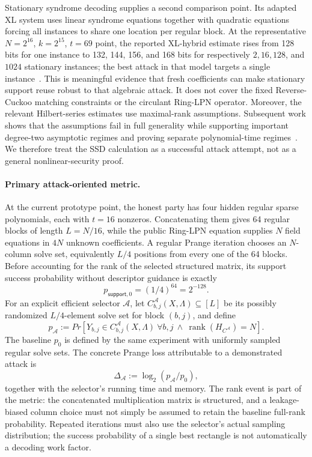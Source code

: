 Stationary syndrome decoding supplies a second comparison point.  Its adapted
XL system uses linear syndrome equations together with quadratic equations
forcing all instances to share one location per regular block.  At the
representative $N=2^{16}$, $k=2^{15}$, $t=69$ point, the reported XL-hybrid
estimate rises from 128 bits for one instance to 132, 144, 156, and 168 bits
for respectively $2,16,128$, and $1024$ stationary instances; the best attack
in that model targets a single instance~\cite{Stationary}.  This is meaningful
evidence that fresh coefficients can make stationary support reuse robust to
that algebraic attack.  It does not cover the fixed Reverse-Cuckoo matching
constraints or the circulant Ring-LPN operator.  Moreover, the relevant
Hilbert-series estimates use maximal-rank assumptions.  Subsequent work shows
that the assumptions fail in full generality while supporting important
degree-two asymptotic regimes and proving separate polynomial-time
regimes~\cite{soundnessRSD}.  We therefore treat the SSD calculation as a
successful attack attempt, not as a general nonlinear-security proof.

\paragraph{Primary attack-oriented metric.}
At the current prototype point, the honest party has four hidden regular sparse
polynomials, each with $t=16$ nonzeros.  Concatenating them gives 64 regular
blocks of length $L=N/16$, while the public Ring-LPN equation supplies $N$
field equations in $4N$ unknown coefficients.  A regular Prange iteration
chooses an $N$-column solve set, equivalently $L/4$ positions from every one of
the 64 blocks.  Before accounting for the rank of the selected structured
matrix, its support success probability without descriptor guidance is exactly
\[
 p_{\mathsf{support},0}=(1/4)^{64}=2^{-128}.
\]
For an explicit efficient selector $\mathcal A$, let
$C^{\mathcal A}_{b,j}(X,\Lambda)\subseteq[L]$ be its possibly randomized
$L/4$-element solve set for block $(b,j)$, and define
\[
 p_{\mathcal A}:=Pr\left[
   Y_{b,j}\in C^{\mathcal A}_{b,j}(X,\Lambda)\ \forall b,j
   \ \land\ \operatorname{rank}(H_{C^{\mathcal A}})=N
 \right].
\]
The baseline $p_0$ is defined by the same experiment with uniformly sampled
regular solve sets.  The concrete Prange loss attributable to a demonstrated
attack is
\[
 \Delta_{\mathcal A}:=\log_2(p_{\mathcal A}/p_0),
\]
together with the selector's running time and memory.  The rank event is part
of the metric: the concatenated multiplication matrix is structured, and a
leakage-biased column choice must not simply be assumed to retain the baseline
full-rank probability.  Repeated iterations must also use the selector's
actual sampling distribution; the success probability of a single best
rectangle is not automatically a decoding work factor.

